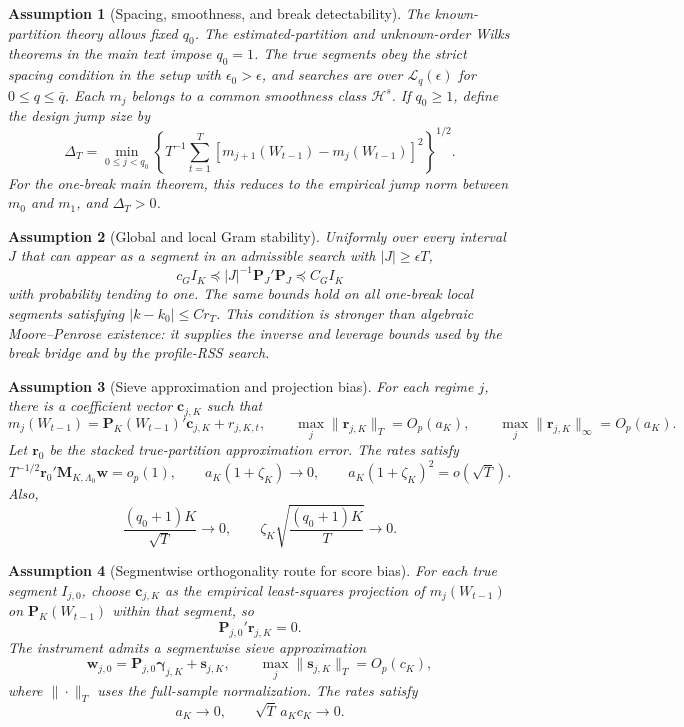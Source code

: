 \documentclass[12pt]{article}
\numberwithin{equation}{section}
\newtheorem{assumption}{Assumption}
\theoremstyle{definition}
\begin{document}
\begin{assumption}[Spacing, smoothness, and break detectability]
\label{ass:prim-breaks}
The known-partition theory allows fixed \(q_0\).  The estimated-partition and
unknown-order Wilks theorems in the main text impose \(q_0=1\).  The true
segments obey the strict spacing condition in the setup with
\(\epsilon_0>\epsilon\), and searches are over \(\mathcal L_q(\epsilon)\) for
\(0\leq q\leq\bar q\).  Each \(m_j\) belongs to a common smoothness class
\(\mathcal H^s\).  If \(q_0\geq1\), define the design jump size by
\[
    \Delta_T=\min_{0\leq j<q_0}
    \left\{T^{-1}\sum_{t=1}^T
    [m_{j+1}(W_{t-1})-m_j(W_{t-1})]^2\right\}^{1/2}.
\]
For the one-break main theorem, this reduces to the empirical jump norm between
\(m_0\) and \(m_1\), and \(\Delta_T>0\).
\end{assumption}

\begin{assumption}[Global and local Gram stability]
\label{ass:prim-gram}
Uniformly over every interval \(J\) that can appear as a segment in an
admissible search with \(|J|\geq\epsilon T\),
\[
    c_G I_K\preceq |J|^{-1}\bm P_J'\bm P_J\preceq C_G I_K
\]
with probability tending to one.  The same bounds hold on all one-break local
segments satisfying \(|k-k_0|\leq Cr_T\).  This condition is stronger than
algebraic Moore--Penrose existence: it supplies the inverse and leverage bounds
used by the break bridge and by the profile-RSS search.
\end{assumption}

\begin{assumption}[Sieve approximation and projection bias]
\label{ass:prim-sieve}
For each regime \(j\), there is a coefficient vector \(\bm c_{j,K}\) such that
\[
    m_j(W_{t-1})
    =
    \bm P_K(W_{t-1})'\bm c_{j,K}+r_{j,K,t},
    \qquad
    \max_j\|\bm r_{j,K}\|_T=O_p(a_K),
    \qquad
    \max_j\|\bm r_{j,K}\|_\infty=O_p(a_K).
\]
Let \(\bm r_0\) be the stacked true-partition approximation error. The rates satisfy
\[
    T^{-1/2}\bm r_0'\bm M_{K,\Lambda_0}\bm w=o_p(1),
    \qquad
    a_K(1+\zeta_K)\to0,
    \qquad
    a_K(1+\zeta_K)^2=o(\sqrt T).
\]
Also,
\[
    \frac{(q_0+1)K}{\sqrt T}\to0,
    \qquad
    \zeta_K\sqrt{\frac{(q_0+1)K}{T}}\to0.
\]
\end{assumption}

\begin{assumption}[Segmentwise orthogonality route for score bias]
\label{ass:score-bias-orthogonality}
For each true segment \(I_{j,0}\), choose \(\bm c_{j,K}\) as the empirical
least-squares projection of \(m_j(W_{t-1})\) on \(\bm P_K(W_{t-1})\) within
that segment, so
\[
    \bm P_{j,0}'\bm r_{j,K}=0.
\]
The instrument admits a segmentwise sieve approximation
\[
    \bm w_{j,0}=\bm P_{j,0}\bm\gamma_{j,K}+\bm s_{j,K},
    \qquad
    \max_j\|\bm s_{j,K}\|_T=O_p(c_K),
\]
where \(\|\cdot\|_T\) uses the full-sample normalization.  The rates satisfy
\[
    a_K\to0,
    \qquad
    \sqrt T\,a_Kc_K\to0.
\]
\end{assumption}
\end{document}

